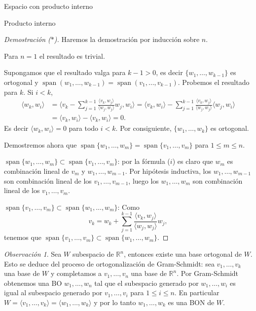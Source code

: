 \documentclass[a4paper,12pt,twoside,spanish,reqno]{amsbook}
\theoremstyle{definition}
\theoremstyle{remark}
\newtheorem{obs}{Observaci\'on}[section]
\newcommand{\la}{\langle}
\newcommand{\ra}{\rangle}
\newcommand{\R}{\mathbb R}
\begin{document}
\begin{chapter}{Espacio con producto interno}
\begin{section}{Producto interno}
\begin{proof}[Demostración ($*$)]
			
			Haremos la demostración por inducción sobre $n$. 
			
			Para $n= 1$ el resultado es trivial.
			
			Supongamos que el resultado valga para $k-1>0$, es decir  $\{w_1,\ldots, w_{k-1}\}$ es ortogonal y 
			$\operatorname{span}(w_1,\ldots, w_{k-1}) = \operatorname{span}(v_1,\ldots, v_{k-1})$. Probemos el resultado para $k$.  Si  $i < k$, 
			\begin{align*}
			\la w_k, w_i \ra &= \la  v_k - \sum_{j = 1}^{k-1} \frac{\la v_k,w_{j}\ra}{\la w_{j},w_{j}\ra}w_{j} , w_i \ra 
			= \la v_k, w_i\ra -  \sum_{j = 1}^{k-1} \frac{\la v_k,w_{j}\ra}{\la w_{j},w_{j}\ra}\la w_{j} , w_i \ra \\
			&=  \la v_k, w_i\ra -  \la v_k, w_i\ra = 0.
			\end{align*}
			Es decir $	\la w_k, w_i \ra =0$ para todo $i < k$. Por consiguiente,  $\{w_1,\ldots, w_{k}\}$ es ortogonal.
			
			Demostremos ahora que $\operatorname{span}\{w_1,\ldots, w_{m}\} = \operatorname{span}\{v_1,\ldots, v_{m}\}$ para $1 \le m \le n$. 
			
			$\operatorname{span}\{w_1,\ldots, w_{m}\} \subset \operatorname{span}\{v_1,\ldots, v_{m}\}$: por la fórmula ($i$) es claro que $w_m$  es combinación lineal de $v_m$ y $w_1,\ldots, w_{m-1}$. Por hipótesis inductiva, los $w_1,\ldots, w_{m-1}$ son combinación lineal de  los $v_1,\ldots, v_{m-1}$,  luego los $w_1,\ldots, w_{m}$ son combinación lineal de los  $v_1,\ldots, v_{m}$.
			
			$\operatorname{span}\{v_1,\ldots, v_{m}\} \subset \operatorname{span}\{w_1,\ldots, w_{m}\}$: Como
			$$
			v_k = w_k + \sum_{j = 1}^{k-1} \frac{\la v_k,w_{j}\ra}{\la w_{j},w_{j}\ra}w_{j},
			$$
			tenemos que 	$\operatorname{span}\{v_1,\ldots, v_{m}\} \subset \operatorname{span}\{w_1,\ldots, w_{m}\}$.
		\end{proof}
		
		
		\medskip
		
		\begin{obs} Sea $W$ subespacio de $\R^n$, entonces existe una base ortogonal de $W$. Esto se deduce del proceso de ortogonalización de Gram-Schmidt: sea $v_1,\ldots,v_k$ una base de $W$ y completamos a $v_{1},\ldots,v_n$ una base de $\R^n$. Por Gram-Schmidt obtenemos una BO $w_{1},\ldots,w_n$ tal que el subespacio generado  por $w_{1},\ldots,w_i$ es igual al subespacio generado por $v_{1},\ldots,v_i$ para $1 \le i \le n$. En  particular $W = \la v_{1},\ldots,v_k \ra =  \la w_{1},\ldots,w_k \ra$ y por lo tanto  $w_{1},\ldots,w_k$ es una BON de $W$.
			

\end{obs}
\end{section}
\end{chapter}
\end{document}
